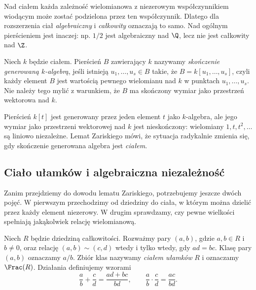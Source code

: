 Nad ciałem każda zależność wielomianowa z niezerowym
współczynnikiem wiodącym może zostać podzielona przez ten współczynnik.
Dlatego dla rozszerzenia ciał \emph{algebraiczny} i
\emph{całkowity} oznaczają to samo. Nad ogólnym pierścieniem jest
inaczej: np. $1/2$ jest algebraiczny nad $\Q$, lecz nie jest
całkowity nad $\Z$.

\begin{definicja}
Niech $k$ będzie ciałem. Pierścień $B$ zawierający $k$
nazywamy \emph{skończenie generowaną $k$-algebrą}, jeśli
istnieją $u_1,\dots,u_s\in B$ takie, że
$B=k[u_1,\dots,u_s]$, czyli każdy element $B$ jest
wartością pewnego wielomianu nad $k$ w punktach $u_1,\dots,u_s$.
Nie należy tego mylić z warunkiem, że $B$ ma skończony wymiar
jako przestrzeń wektorowa nad $k$.
\end{definicja}

\begin{przyklad}
Pierścień $k[t]$ jest generowany przez jeden element $t$
jako $k$-algebra, ale jego wymiar jako przestrzeni wektorowej
nad $k$ jest nieskończony: wielomiany $1,t,t^2,\dots$
są liniowo niezależne. Lemat Zariskiego mówi, że sytuacja
radykalnie zmienia się, gdy skończenie generowana algebra
jest \emph{ciałem}.
\end{przyklad}

\subsection{Ciało ułamków i algebraiczna niezależność}

Zanim przejdziemy do dowodu lematu Zariskiego, potrzebujemy jeszcze
dwóch pojęć. W pierwszym przechodzimy od dziedziny do ciała,
w którym można dzielić przez każdy element niezerowy.
W drugim sprawdzamy, czy pewne wielkości spełniają jakąkolwiek
relację wielomianową.

\begin{definicja}
Niech $R$ będzie dziedziną całkowitości.
Rozważmy pary $(a,b)$, gdzie $a,b\in R$ i $b\ne0$,
oraz relację $(a,b)\sim(c,d)$ wtedy i tylko wtedy,
gdy $ad=bc$. Klasę pary $(a,b)$ oznaczamy $a/b$.
Zbiór klas nazywamy \emph{ciałem ułamków} $R$
i oznaczamy $\Frac(R)$. Działania definiujemy wzorami
\[
\frac ab+\frac cd=\frac{ad+bc}{bd},\qquad
\frac ab\cdot\frac cd=\frac{ac}{bd}.
\]
\end{definicja}

